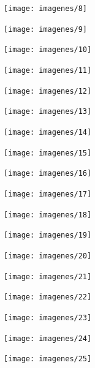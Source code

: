 \documentclass{article}
\begin{document}
\begin{enumerate}
\begin{figure}[H]
			\end{figure}
			\begin{figure}[H]
				\centering
				\texttt{[image: imagenes/8]}
			\end{figure}
			\begin{figure}[H]
				\centering
				\texttt{[image: imagenes/9]}
			\end{figure}
			\begin{figure}[H]
				\centering
				\texttt{[image: imagenes/10]}
			\end{figure}
			\begin{figure}[H]
				\centering
				\texttt{[image: imagenes/11]}
			\end{figure}
			\begin{figure}[H]
				\centering
				\texttt{[image: imagenes/12]}
			\end{figure}
			\begin{figure}[H]
				\centering
				\texttt{[image: imagenes/13]}
			\end{figure}	
			\begin{figure}[H]
				\centering
				\texttt{[image: imagenes/14]}
			\end{figure}
			\begin{figure}[H]
				\centering
				\texttt{[image: imagenes/15]}
			\end{figure}
			\begin{figure}[H]
				\centering
				\texttt{[image: imagenes/16]}
			\end{figure}
			\begin{figure}[H]
				\centering
				\texttt{[image: imagenes/17]}
			\end{figure}
			\begin{figure}[H]
				\centering
				\texttt{[image: imagenes/18]}
			\end{figure}
			\begin{figure}[H]
				\centering
				\texttt{[image: imagenes/19]}
			\end{figure}
			\begin{figure}[H]
				\centering
				\texttt{[image: imagenes/20]}
			\end{figure}
			\begin{figure}[H]
				\centering
				\texttt{[image: imagenes/21]}
			\end{figure}
			\begin{figure}[H]
				\centering
				\texttt{[image: imagenes/22]}
			\end{figure}
			\begin{figure}[H]
				\centering
				\texttt{[image: imagenes/23]}
			\end{figure}
			\begin{figure}[H]
				\centering
				\texttt{[image: imagenes/24]}
			\end{figure}			
			\begin{figure}[H]
				\centering
				\texttt{[image: imagenes/25]}
			\end{figure}
	\end{enumerate}
\end{document}
